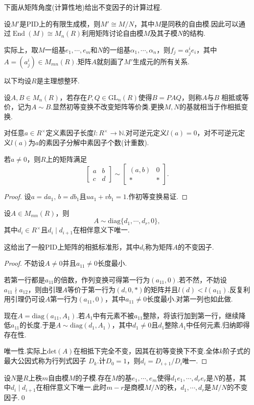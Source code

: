 下面从矩阵角度(计算性地)给出不变因子的计算过程.

设$M'$是PID上的有限生成模，则$M'\cong M/N$，其中$M$是同秩的自由模.因此可以通过$\operatorname*{End}(M)\cong M_n(R)$利用矩阵讨论自由模$M$及其子模$N$的结构.

实际上，取$M$一组基$e_1,\cdots,e_m$和$N$的一组基$\alpha_1,\cdots,\alpha_n$，则$f_j=a^i_je_i$，其中$A=(a^i_j)\in M_{mn}(R)$.矩阵$A$就刻画了$M'$生成元的所有关系.

{\heiti 以下均设$R$是主理想整环.}

设$A,B\in M_n(R)$，若存在$P,Q\in\mathrm{GL}_n(R)$使得$B=PAQ$，则称$A$与$B$ {\heiti 相抵}或{\heiti 等价}，记为$A\sim B$.显然初等变换不改变矩阵等价类.更换$M,N$的基就相当于作相抵变换.

对任意$a\in R^\times$定义素因子长度$l\colon R^\times\to\mathbb{N}$.对可逆元定义$l(a)=0$，对不可逆元定义$l(a)$为$a$的素因子分解中素因子个数(计重数).
\begin{lemma*}
    若$a\ne 0$，则$R$上的矩阵满足
    \[
        \begin{bmatrix}
            a&b\\
            c&d
        \end{bmatrix}\sim\begin{bmatrix}
            (a,b)&0\\
            *&*
        \end{bmatrix}.
    \]
\end{lemma*}
\begin{proof}
    设$a=da_1,\,b=db_1$且$ua_1+vb_1=1$.作初等变换易证.
\end{proof}
\begin{thm}
    设$A\in M_{mn}(R)$，则
    \[
        A\sim\mathrm{diag}\{d_1,\cdots,d_r,0\},
    \]
    其中$d_i\in R^\times$且$d_i\mid d_{i+1}$在相伴意义下唯一.
\end{thm}
\begin{remark}
    这给出了一般PID上矩阵的{\heiti 相抵标准形}，其中$d_i$称为矩阵$A$的{\heiti 不变因子}.
\end{remark}
\begin{proof}
    不妨设$A\ne 0$并且$a_{11}\ne 0$长度最小.

    若第一行都是$a_{11}$的倍数，作列变换可得第一行为$(a_{11},0)$.若不然，不妨设$a_{11}\nmid a_{12}$，则由引理$A$等价于第一行为$(d,0,*)$的矩阵并且$l(d)<l(a_{11})$.反复利用引理仍可设$A$第一行为$(a_{11},0)$，其中$a_{11}\ne 0$长度最小.对第一列也如此做.

    现在$A=\mathrm{diag}(a_{11},A_1)$.若$A_1$中有元素不被$a_{11}$整除，将该行加到第一行，继续降低$a_{11}$的长度.于是$A\sim\mathrm{diag}(d_1,A_1)$，其中$d_1\ne 0$且$d_1$整除$A_1$中任何元素.归纳即得存在性.

    唯一性.实际上$\mathrm{det}(A)$在相抵下完全不变，因其在初等变换下不变.全体$k$阶子式的最大公因式称为{\heiti 行列式因子} $D_k$.计$D_0=1$，则$d_i=D_{i+1}/D_i$唯一.
\end{proof}
\begin{cor*}
    设$N$是$R$上秩$m$自由模$M$的子模.存在$M$的基$e_1,\cdots,e_m$使得$d_1e_1,\cdots,d_re_r$是$N$的基，其中$d_i\mid d_{i+1}$在相伴意义下唯一.此时$m-r$是商模$M/N$的秩，$d_1,\cdots,d_r$是$M/N$的不变因子.\qed
\end{cor*}

